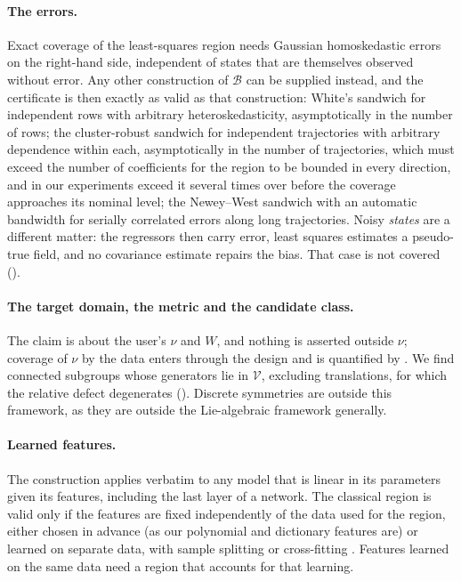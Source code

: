 \paragraph{The errors.} Exact coverage of the least-squares region needs
Gaussian homoskedastic errors on the right-hand side, independent of states
that are themselves observed without error. Any other construction of
$\mathcal B$ can be supplied instead, and the certificate is then exactly as
valid as that construction: White's sandwich \citep{white1980heteroskedasticity}
for independent rows with arbitrary heteroskedasticity, asymptotically in the
number of rows; the cluster-robust sandwich for independent trajectories with
arbitrary dependence within each, asymptotically in the number of trajectories,
which must exceed the number of coefficients for the region to be bounded in
every direction, and in our experiments exceed it several times over before the
coverage approaches its nominal level; the Newey--West sandwich \citep{newey1987simple} with an
automatic bandwidth \citep{andrews1991heteroskedasticity} for serially
correlated errors along long trajectories. Noisy \emph{states} are a different
matter: the regressors then carry error, least squares estimates a
pseudo-true field, and no covariance estimate repairs the bias. That case is
not covered ().

\paragraph{The target domain, the metric and the candidate class.} The claim
is about the user's $\nu$ and $W$, and nothing is asserted outside $\nu$;
coverage of $\nu$ by the data enters through the design and is quantified by
. We find connected subgroups whose generators lie in
$\mathcal V$, excluding translations, for which the relative defect
degenerates (). Discrete symmetries are outside this
framework, as they are outside the Lie-algebraic framework generally.

\paragraph{Learned features.} The construction applies verbatim to any model
that is linear in its parameters given its features, including the last layer
of a network. The classical region is valid only if the features are fixed
independently of the data used for the region, either chosen in advance (as
our polynomial and dictionary features are) or learned on separate data, with
sample splitting or cross-fitting \citep{chernozhukov2018double}. Features
learned on the same data need a region that accounts for that learning.
